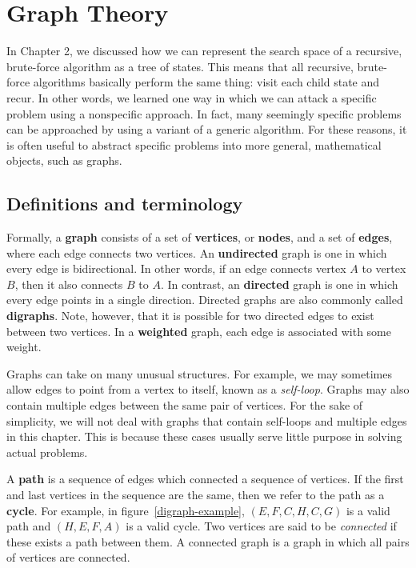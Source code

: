 \chapter{Graph Theory}

In Chapter 2, we discussed how we can represent the search space of a recursive, brute-force algorithm as a tree of states. This means that all recursive, brute-force algorithms basically perform the same thing: visit each child state and recur. In other words, we learned one way in which we can attack a specific problem using a nonspecific approach. In fact, many seemingly specific problems can be approached by using a variant of a generic algorithm. For these reasons, it is often useful to abstract specific problems into more general, mathematical objects, such as graphs. 


\section{Definitions and terminology}

Formally, a \textbf{graph} consists of a set of \textbf{vertices}, or \textbf{nodes}, and a set of \textbf{edges}, where each edge connects two vertices. An \textbf{undirected} graph is one in which every edge is bidirectional. In other words, if an edge connects vertex $A$ to vertex $B$, then it also connects $B$ to $A$. In contrast, an \textbf{directed} graph is one in which every edge points in a single direction. Directed graphs are also commonly called \textbf{digraphs}. Note, however, that it is possible for two directed edges to exist between two vertices. In a \textbf{weighted} graph, each edge is associated with some weight.

Graphs can take on many unusual structures. For example, we may sometimes allow edges to point from a vertex to itself, known as a \textit{self-loop}. Graphs may also contain multiple edges between the same pair of vertices. For the sake of simplicity, we will not deal with graphs that contain self-loops and multiple edges in this chapter. This is because these cases usually serve little purpose in solving actual problems. 

A \textbf{path} is a sequence of edges which connected a sequence of vertices.  If the first and last vertices in the sequence are the same, then we refer to the path as a \textbf{cycle}. For example, in figure~\ref{digraph-example}, $(E, F, C, H, C, G)$ is a valid path and $(H, E, F, A)$ is a valid cycle. Two vertices are said to be \textit{connected} if these exists a path between them. A connected graph is a graph in which all pairs of vertices are connected. 

